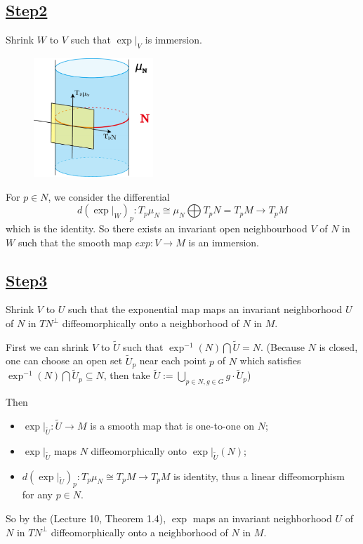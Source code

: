 \documentclass[reqno,11pt]{amsart}
\numberwithin{equation}{section}
\theoremstyle{plain}
\theoremstyle{plain}
\numberwithin{equation}{section}
\theoremstyle{remark}
\begin{document}
\subsection*{\underline{Step2}} Shrink $W$ to $V$ such that $\exp |_V$ is immersion.
\begin{figure}[th]
	\centering
	\includegraphics[width=0.4\textwidth]{figures/figure11.png}\\
	\caption{}
	\label{fig6}
\end{figure}
For $p \in N$, we consider the differential
$$\textstyle d(\exp|_W)_p:T_p \mu_N \cong \mu_N \bigoplus T_pN = T_pM \longrightarrow T_pM$$
which is the identity. So there exists an invariant open neighbourhood $V$ of $N$ in $W$ such that the smooth map $exp:V \rightarrow M$ is an immersion.

\subsection*{\underline{Step3}} Shrink $V$ to $U$ such that the exponential map maps an invariant neighborhood $U$ of $N$ in $TN^{\perp}$ diffeomorphically onto a
neighborhood of $N$ in $M$.

First we can shrink $V$ to $\tilde{U}$ such that $\exp^{-1}(N) \bigcap \tilde{U}=N$. (Because $N$ is closed, one can choose an open set $\tilde{U}_p$ near each point $p$ of $N$ which satisfies $\exp^{-1}(N) \bigcap \tilde{U}_p \subseteq N$, then take $\tilde{U}:=\bigcup_{p \in N, g\in G}g\cdot\tilde{U}_p$)

Then
\begin{itemize}
	\item $\exp|_{\tilde{U}}:\tilde{U}\rightarrow M$ is a smooth map that is one-to-one on $N$;
	\item $\exp|_{\tilde{U}}$ maps $N$ diffeomorphically onto $\exp|_{\tilde{U}}(N)$;
	\item $d(\exp|_{\tilde{U}})_p: T_p\mu_N \cong T_pM \rightarrow T_pM$ is identity, thus a linear diffeomorphism for any $p \in N$.
\end{itemize}
So by the \cite{ZW1} (Lecture 10, Theorem 1.4), $\exp$ maps an invariant neighborhood $U$ of $N$ in $TN^{\perp}$ diffeomorphically onto a
neighborhood of $N$ in $M$.
\end{document}
